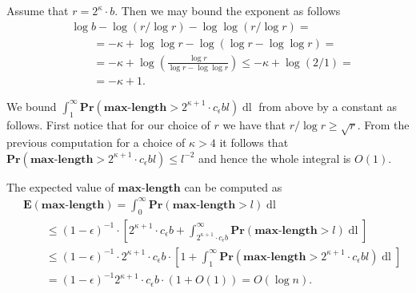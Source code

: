 \documentclass[12pt,notitlepage]{report}
\theoremstyle{definition}
\theoremstyle{plain}
\newcommand{\Prob}[1]{\mathbf{Pr}\left(#1\right)}
\newcommand{\Expect}[1]{\mathbf{E}\left(#1\right)}
\newcommand{\maxlength}{\mathbf{max\mbox{-}length}}
\begin{document}
Assume that $r = 2^{\kappa} \cdot b$. Then we may bound the exponent as follows
\[
\begin{split}
& \log b - \log (r / \log r) - \log \log (r / \log r) = \\
& \qquad = -\kappa + \log \log r - \log (\log r - \log \log r) = \\
& \qquad = -\kappa + \log \left(\frac{\log r}{\log r - \log \log r}\right) \leq -\kappa + \log (2 / 1) = \\
& \qquad = -\kappa + 1.
\end{split}
\]

We bound $\int_{1}^{\infty} \Prob{\maxlength > 2^{\kappa + 1} \cdot c_\epsilon bl} \operatorname{dl}$ from above by a constant as follows.
First notice that for our choice of $r$ we have that $r/\log r \geq \sqrt{r}$. From the previous computation for a choice of $\kappa > 4$ it follows that 
$\Prob{\maxlength > 2^{\kappa + 1} \cdot c_\epsilon bl} \leq l^{-2}$ and hence the whole integral is $O(1)$.

The expected value of $\maxlength$ can be computed as
\[
\begin{split}
& \Expect{\maxlength} = \displaystyle\int_{0}^{\infty} \Prob{\maxlength > l} \operatorname{dl} \\
	& \qquad \leq (1 - \epsilon)^{-1} \cdot \left[2^{\kappa + 1} \cdot c_\epsilon b + \displaystyle\int_{2^{\kappa + 1} \cdot c_\epsilon b}^{\infty} \Prob{\maxlength > l} \operatorname{dl}\right] \\
	& \qquad \leq (1 - \epsilon)^{-1} \cdot 2^{\kappa + 1} \cdot c_\epsilon b \cdot \left[1 + \displaystyle\int_{1}^{\infty} \Prob{\maxlength > 2^{\kappa + 1} \cdot c_\epsilon bl} \operatorname{dl}\right] \\
	& \qquad = (1 - \epsilon)^{-1} 2^{\kappa + 1} \cdot c_\epsilon b \cdot (1 + O(1)) = O(\log n).
\end{split}
\]
\end{document}
